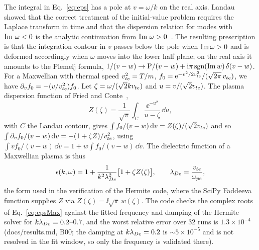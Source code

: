 The integral in Eq.~\eqref{eq:eps} has a pole at $v=\omega/k$ on the real axis. Landau showed that the correct treatment of the initial-value problem requires the Laplace transform in time and that the dispersion relation for modes with $\operatorname{Im}\,\omega<0$ is the analytic continuation from $\operatorname{Im}\,\omega>0$~\citep{Landau1946}. The resulting prescription is that the integration contour in $v$ passes below the pole when $\operatorname{Im}\omega>0$ and is deformed accordingly when $\omega$ moves into the lower half plane; on the real axis it amounts to the Plemelj formula, $1/(v-w)\to\mathrm{P}/(v-w)+\mathrm{i}\pi\,\mathrm{sgn}(\operatorname{Im} w)\,\delta(v-w)$. For a Maxwellian with thermal speed $v_{te}^2=T/m$, $f_0=\mathrm{e}^{-v^2/2v_{te}^2}/(\sqrt{2\pi}\,v_{te})$, we have $\partial_vf_0=-(v/v_{te}^2)f_0$. Let $\zeta=\omega/(\sqrt2kv_{te})$ and $u=v/(\sqrt2v_{te})$. The plasma dispersion function of Fried and Conte~\citep{FriedConte1961},
\begin{equation}
Z(\zeta)=\frac{1}{\sqrt\pi}\int_{C}\frac{\ee^{-u^2}}{u-\zeta}\,\dd u ,\label{eq:Z}
\end{equation}
with $C$ the Landau contour, gives $\int f_0/(v-w)\,\mathrm{d} v=Z(\zeta)/(\sqrt2v_{te})$ and so $\int\partial_vf_0/(v-w)\,\mathrm{d} v=-(1+\zeta Z)/v_{te}^2$, using $\int vf_0/(v-w)\,\dd v=1+w\int f_0/(v-w)\,\dd v$. The dielectric function of a Maxwellian plasma is thus
\begin{equation}
\epsilon(k,\omega)=1+\frac{1}{k^2\lambda_{De}^2}\big[1+\zeta Z(\zeta)\big] ,\qquad\lambda_{De}=\frac{v_{te}}{\omega_{pe}} ,\label{eq:epsMax}
\end{equation}
the form used in the verification of the Hermite code, where the SciPy Faddeeva function supplies $Z$ via $Z(\zeta)=\ii\sqrt\pi\,w(\zeta)$. The code checks the complex roots of Eq.~\eqref{eq:epsMax} against the fitted frequency and damping of the Hermite solver for $k\lambda_{De}=0.2$--$0.7$, and the worst relative error over 32 runs is $1.3\times10^{-4}$ (docs/results.md, B00; the damping at $k\lambda_{De}=0.2$ is $\sim5\times10^{-5}$ and is not resolved in the fit window, so only the frequency is validated there).

